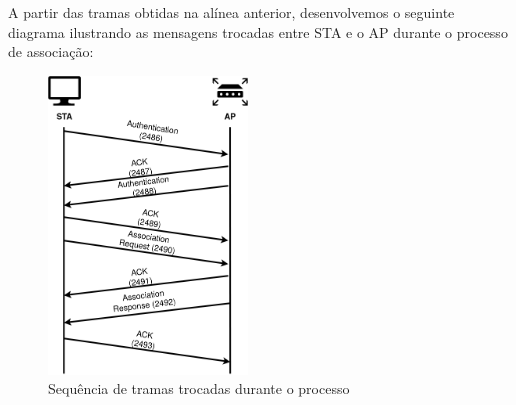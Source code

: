     \par A partir das tramas obtidas na alínea anterior, desenvolvemos o seguinte diagrama ilustrando as mensagens trocadas entre STA e o AP durante o processo de associação:

    \begin{figure}[H]
        \centering
        \includegraphics[width=150pt]{Prints/Questao6/STA-AP.png}
        \caption{Sequência de tramas trocadas durante o processo} \label{questao6-2}
    \end{figure}